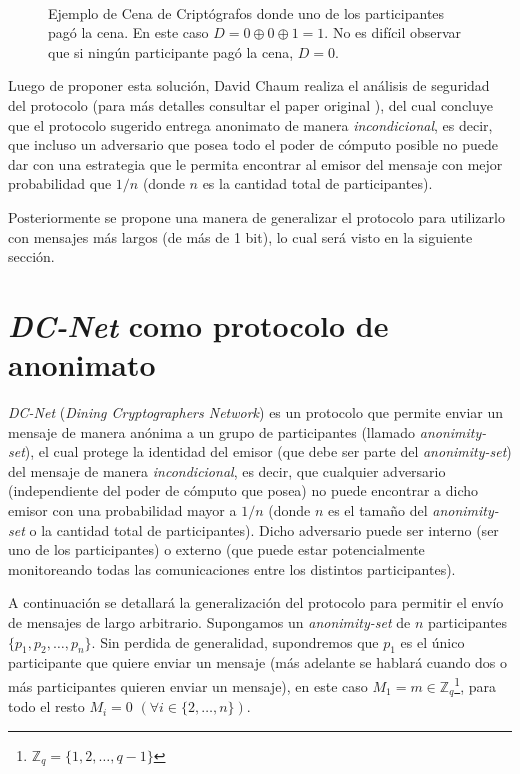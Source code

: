 \begin{figure}[H]
\centering
{} \  

\protect\caption{Ejemplo de Cena de Criptógrafos donde uno de los participantes pagó la cena. En este caso $D = 0 \oplus 0 \oplus 1 = 1$. 
No es difícil observar que si ningún participante pagó la cena, $D = 0$. }

\label{fig:example_dcnet_chaum}
\end{figure}

Luego de proponer esta solución, David Chaum realiza el análisis de seguridad del protocolo (para más detalles consultar el paper original 
\cite{chaum1988dining}), del cual concluye que el protocolo sugerido entrega anonimato de manera \emph{incondicional}, es decir, que incluso 
un adversario que posea todo el poder de cómputo posible no puede dar con una estrategia que le permita encontrar al emisor del mensaje 
con mejor probabilidad que $1/n$ (donde $n$ es la cantidad total de participantes).

Posteriormente se propone una manera de generalizar el protocolo para utilizarlo con mensajes más largos (de más de 1 bit), lo cual será 
visto en la siguiente sección.

\section{\emph{DC-Net} como protocolo de anonimato}

\emph{DC-Net} (\emph{Dining Cryptographers Network}) es un protocolo que permite enviar un mensaje de manera anónima a un grupo de participantes 
(llamado \emph{anonimity-set}), el cual protege la identidad del emisor (que debe ser parte del \emph{anonimity-set}) del mensaje de manera 
\emph{incondicional}, es decir, que cualquier adversario (independiente del poder de cómputo que posea) no puede encontrar a dicho emisor con 
una probabilidad mayor a $1/n$ (donde $n$ es el tamaño del \emph{anonimity-set} o la cantidad total de participantes). Dicho adversario puede 
ser interno (ser uno de los participantes) o externo (que puede estar potencialmente monitoreando todas las comunicaciones entre los distintos participantes).

A continuación se detallará la generalización del protocolo para permitir el envío de mensajes de largo arbitrario. 
Supongamos un \emph{anonimity-set} de $n$ participantes $\{p_1, p_2, \ldots, p_n\}$. Sin perdida de generalidad, supondremos que $p_1$ es el único 
participante que quiere enviar un mensaje (más adelante 
se hablará cuando dos o más participantes quieren enviar un mensaje), 
en este caso $M_1 = m \in \mathbb{Z}_q$\footnote{$\mathbb{Z}_q = \{1, 2, \ldots, q - 1\}$}, para todo el resto $M_i = 0$ $(\forall i \in \{2, \ldots, n\})$.

